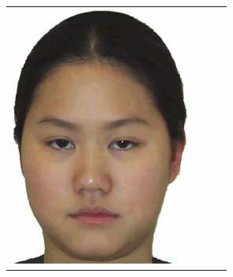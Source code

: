 \begin{longtable}{|N||c|c|c|}
  \begin{minipage}{.29\textwidth}
    \includegraphics[width=\textwidth,height=\textheight,keepaspectratio]{images/yin_target1}
  \end{minipage} & 
  \begin{minipage}{.29\textwidth}

\end{minipage}
\end{longtable}
